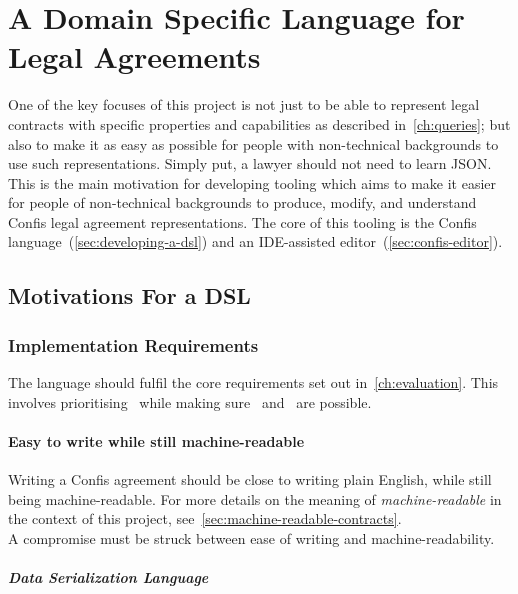 \chapter{A Domain Specific Language for Legal Agreements}\label{ch:lang}

One of the key focuses of this project is not just to be able to represent legal contracts with specific properties and capabilities as described in~\autoref{ch:queries};
but also to make it as easy as possible for people with non-technical backgrounds to use such representations.
Simply put, a lawyer should not need to learn JSON.\\

This is the main motivation for developing tooling which aims to make it easier for people of non-technical backgrounds to produce, modify, and understand Confis legal agreement representations.
The core of this tooling is the Confis language~(\autoref{sec:developing-a-dsl}) and an IDE-assisted editor~(\autoref{sec:confis-editor}).


\section{Motivations For a DSL}\label{sec:developing-a-dsl}

\subsection{Implementation Requirements}\label{subsec:dsl:requirements}

The language should fulfil the core requirements set out in~\autoref{ch:evaluation}.
This involves prioritising~ while making sure~ and~ are possible.

\subsubsection{Easy to write while still machine-readable}

Writing a Confis agreement should be close to writing plain English, while still being machine-readable.
For more details on the meaning of \emph{machine-readable} in the context of this project, see~\autoref{sec:machine-readable-contracts}.\\


A compromise must be struck between ease of writing and machine-readability.

\paragraph{Data Serialization Language}

